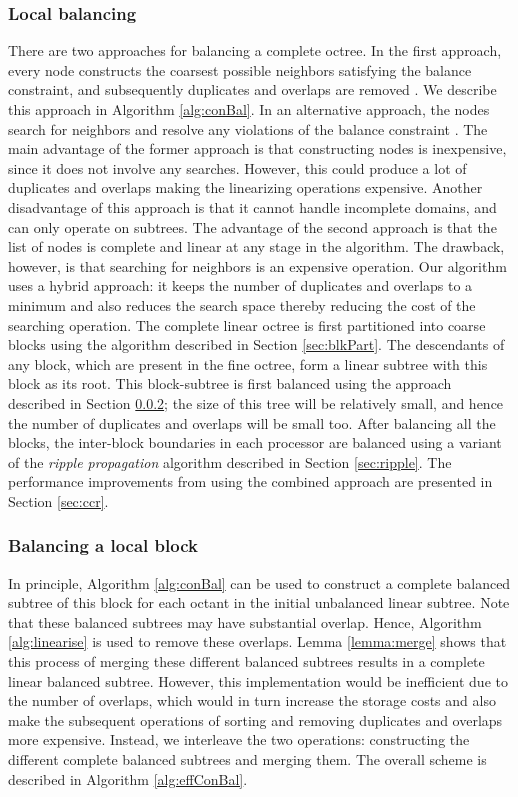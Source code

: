 \subsubsection{Local balancing}
\label{sec:combo}
There are two approaches for balancing a complete octree. In the first
approach, every node constructs the coarsest possible neighbors
satisfying the balance constraint, and subsequently duplicates and
overlaps are removed \cite{bern99}. We describe this approach in
Algorithm \ref{alg:conBal}.  In an alternative approach, the nodes
search for neighbors and resolve any violations of the balance
constraint \cite{tu04a, tu05}. The main advantage of the former
approach is that constructing nodes is inexpensive, since it does not
involve any searches. However, this could produce a lot of duplicates
and overlaps making the linearizing operations expensive. Another
disadvantage of this approach is that it cannot handle incomplete
domains, and can only operate on subtrees. The advantage of the second
approach is that the list of nodes is complete and linear at any stage
in the algorithm. The drawback, however, is that searching for
neighbors is an expensive operation. Our algorithm uses a hybrid
approach: it keeps the number of duplicates and overlaps to a minimum
and also reduces the search space thereby reducing the cost of the
searching operation. The complete linear octree is first partitioned
into coarse blocks using the algorithm described in Section
\ref{sec:blkPart}.  The descendants of any block, which are present in
the fine octree, form a linear subtree with this block as its
root. This block-subtree is first balanced using the approach
described in Section \ref{sec:conBal}; the size of this tree will be
relatively small, and hence the number of duplicates and overlaps will
be small too. After balancing all the blocks, the inter-block
boundaries in each processor are balanced using a variant of the {\em
ripple propagation} algorithm \cite{tu05} described in Section
\ref{sec:ripple}. The performance improvements from using the combined
approach are presented in Section \ref{sec:ccr}.

\subsubsection{Balancing a local block}
\label{sec:conBal}
In principle, Algorithm \ref{alg:conBal} can be used to construct a
complete balanced subtree of this block for each octant in the initial
unbalanced linear subtree. Note that these balanced subtrees may have
substantial overlap. Hence, Algorithm \ref{alg:linearise} is used to
remove these overlaps. Lemma \ref{lemma:merge} shows that this process
of merging these different balanced subtrees results in a complete
linear balanced subtree. However, this implementation would be
inefficient due to the number of overlaps, which would in turn
increase the storage costs and also make the subsequent operations of
sorting and removing duplicates and overlaps more expensive. Instead,
we interleave the two operations: constructing the different complete
balanced subtrees and merging them. The overall scheme is described in
Algorithm \ref{alg:effConBal}.

